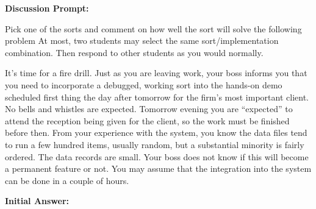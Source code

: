 \documentclass[10pt,letterpaper,final]{report}
\begin{document}
\begin{center}
  \vline
\end{center}


\medskip

\noindent\textbf{Discussion Prompt:}

Pick one of the sorts and comment on how well the sort will solve the following problem At most, two students may select the same sort/implementation combination. Then respond to other students as you would normally.

It's time for a fire drill. Just as you are leaving work, your boss informs you that you need to incorporate a debugged, working sort into the hands-on demo scheduled first thing the day after tomorrow for the firm's most important client. No bells and whistles are expected. Tomorrow evening you are ``expected'' to attend the reception being given for the client, so the work must be finished before then. From your experience with the system, you know the data files tend to run a few hundred items, usually random, but a substantial minority is fairly ordered. The data records are small. Your boss does not know if this will become a permanent feature or not. You may assume that the integration into the system can be done in a couple of hours.

\medskip
\noindent\textbf{Initial Answer:}
\medskip
\end{document}
